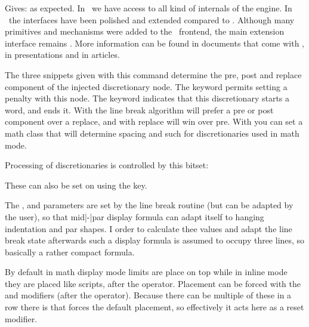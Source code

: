Gives: \quotation {\inlinebuffer} as expected. In \LUA\ we have access to all
kind of internals of the engine. In \LUAMETATEX\ the interfaces have been
polished and extended compared to \LUATEX. Although many primitives and
mechanisms were added to the \TEX\ frontend, the main extension interface remains
\LUA. More information can be found in documents that come with \CONTEXT, in
presentations and in articles.

\stopnewprimitive

\startoldprimitive[title={\prm {discretionary}}]

The three snippets given with this command determine the pre, post and replace
component of the injected discretionary node. The  keyword permits
setting a penalty with this node. The  keyword indicates that
this discretionary starts a word, and  ends it. With 
the line break algorithm will prefer a pre or post component over a replace, and
with  replace will win over pre. With  you can set a
math class that will determine spacing and such for discretionaries used in math
mode.

\stopoldprimitive

\startnewprimitive[title={\prm {discretionaryoptions}}]

Processing of discretionaries is controlled by this bitset:


These can also be set on  using the  key.

\stopnewprimitive

\startoldprimitive[title={\prm {displayindent}}]

The ,  and 
parameters are set by the line break routine (but can be adapted by the user), so
that mid|-|par display formula can adapt itself to hanging indentation and par
shapes. I order to calculate thee values and adapt the line break state
afterwards such a display formula is assumed to occupy three lines, so basically
a rather compact formula.

\stopoldprimitive

\startoldprimitive[title={\prm {displaylimits}}]

By default in math display mode limits are place on top while in inline mode they
are placed like scripts, after the operator. Placement can be forced with the
 and  modifiers (after the operator). Because there
can be multiple of these in a row there is  that forces the
default placement, so effectively it acts here as a reset modifier.

